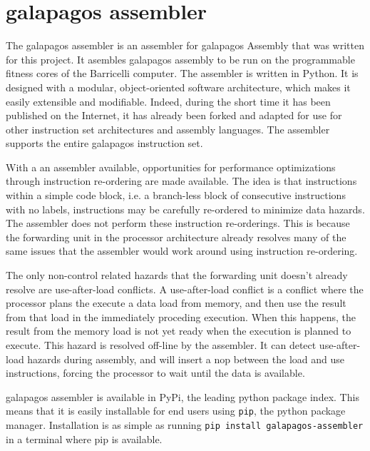 \section{\Gls{galapagos assembler}}

The \Gls{galapagos assembler} is an assembler for \Gls{galapagos} Assembly that was written for this project.
It asembles galapagos assembly to be run on the programmable fitness cores of the Barricelli computer.
The assembler is written in Python. 
It is designed with a modular, object-oriented software architecture, which makes it easily extensible and modifiable.
Indeed, during the short time it has been published on the Internet, it has already been forked and adapted for use for other instruction set architectures and assembly languages.\cn {}
The assembler supports the entire \Gls{galapagos} instruction set.

With a an assembler available, opportunities for performance optimizations through instruction re-ordering are made available.
The idea is that instructions within a simple code block, i.e. a branch-less block of consecutive instructions with no labels, instructions may be carefully re-ordered to minimize data hazards.
The assembler does not perform these instruction re-orderings.
This is because the forwarding unit in the processor architecture already resolves many of the same issues that the assembler would work around using instruction re-ordering.

The only non-control related hazards that the forwarding unit doesn't already resolve are use-after-load conflicts.
A use-after-load conflict is a conflict where the processor plans the execute a data load from memory, and then use the result from that load in the immediately proceding execution.
When this happens, the result from the memory load is not yet ready when the execution is planned to execute.
This hazard is resolved off-line by the assembler.
It can detect use-after-load hazards during assembly, and will insert a \gls{nop} between the load and use instructions, forcing the processor to wait until the data is available.

\Gls{galapagos assembler} is available in PyPi, the leading python package index.
This means that it is easily installable for end users using \texttt{pip}, the python package manager.
Installation is as simple as running \texttt{pip install galapagos-assembler} in a terminal where pip is available.


